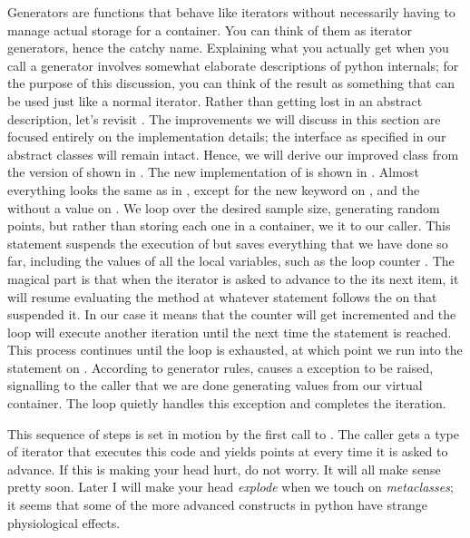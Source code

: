 Generators are functions that behave like iterators without necessarily having to manage actual
storage for a container. You can think of them as iterator generators, hence the catchy name.
Explaining what you actually get when you call a generator involves somewhat elaborate
descriptions of python internals; for the purpose of this discussion, you can think of the
result as something that can be used just like a normal iterator. Rather than getting lost in
an abstract description, let's revisit . The improvements we will
discuss in this section are focused entirely on the implementation details; the interface as
specified in our abstract classes will remain intact. Hence, we will derive our improved class
from the version of  shown in . The new
implementation of  is shown in .
%
%
Almost everything looks the same as in , except for the new
keyword  on , and the  without a
value on . We loop over the desired sample size, generating
random points, but rather than storing each one in a container, we  it to our
caller. This statement suspends the execution of  but saves everything that we
have done so far, including the values of all the local variables, such as the loop counter
. The magical part is that when the iterator is asked to advance to the its next
item, it will resume evaluating the method  at whatever statement follows the
 on  that suspended it. In our case it means
that the counter will get incremented and the loop will execute another iteration until the
next time the  statement is reached. This process continues until the loop is
exhausted, at which point we run into the  statement on
. According to generator rules,  causes a
 exception to be raised, signalling to the caller that we are done
generating values from our virtual container. The  loop quietly handles this
exception and completes the iteration.

This sequence of steps is set in motion by the first call to . The caller gets a
type of iterator that executes this code and yields points at 
every time it is asked to advance.  If this is making your head hurt, do not worry. It will all
make sense pretty soon. Later I will make your head {\em explode} when we touch on {\em
  metaclasses}; it seems that some of the more advanced constructs in python have strange
physiological effects\supercite{guido-metaclasses}.

